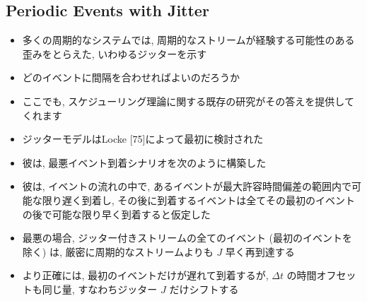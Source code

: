 \begin{frame}{}
\end{frame}


\subsection{Periodic Events with Jitter}
\label{ssec: periodic events with jitter}

\begin{frame}{}
    \begin{itemize}
        \item 多くの周期的なシステムでは, 周期的なストリームが経験する可能性のある歪みをとらえた, いわゆるジッターを示す
    \end{itemize}
\end{frame}

\begin{frame}{}
\end{frame}

\begin{frame}{}
    \begin{itemize}
        \item どのイベントに間隔を合わせればよいのだろうか
        \item ここでも, スケジューリング理論に関する既存の研究がその答えを提供してくれます
        \item ジッターモデルはLocke [75]によって最初に検討された
        \item 彼は, 最悪イベント到着シナリオを次のように構築した
        \item 彼は, イベントの流れの中で, あるイベントが最大許容時間偏差の範囲内で可能な限り遅く到着し, その後に到着するイベントは全てその最初のイベントの後で可能な限り早く到着すると仮定した
    \end{itemize}
\end{frame}

\begin{frame}{}
\end{frame}

\begin{frame}{}
    \begin{itemize}
        \item 最悪の場合, ジッター付きストリームの全てのイベント (最初のイベントを除く) は, 厳密に周期的なストリームよりも $J$ 早く再到達する
        \item より正確には, 最初のイベントだけが遅れて到着するが, $\Delta t$ の時間オフセットも同じ量, すなわちジッター $J$ だけシフトする
    \end{itemize}
\end{frame}

